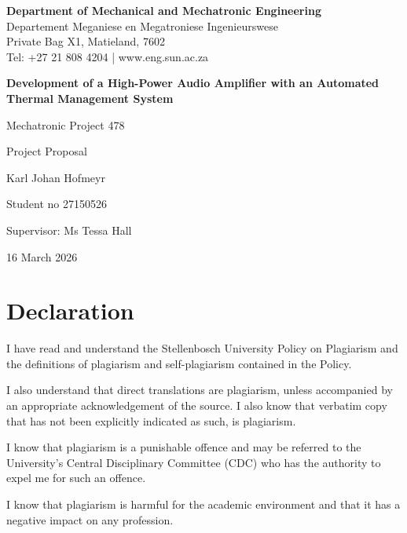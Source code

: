 \documentclass[12pt,a4paper]{report}
\newcommand{\frontmatterpages}{
	\pagenumbering{roman}
}
\newcommand{\departmentheader}{
	\begin{center}
		{\small \textbf{Department of Mechanical and Mechatronic Engineering}}\\
		{\small Departement Meganiese en Megatroniese Ingenieurswese}\\
		{\small Private Bag X1, Matieland, 7602}\\
		{\small Tel: +27 21 808 4204 \;|\; www.eng.sun.ac.za}
	\end{center}
}
\newcommand{\projecttitle}{Development of a High-Power Audio Amplifier with an Automated Thermal Management System}
\newcommand{\projectmodule}{Mechatronic Project 478}
\newcommand{\studentname}{Karl Johan Hofmeyr}
\newcommand{\studentnumber}{27150526}
\newcommand{\supervisorname}{Ms Tessa Hall}
\newcommand{\submissiondate}{16 March 2026}
\begin{document}
	
	\begin{titlepage}
		\departmentheader
		
		\vspace{2.5cm}
		
		\begin{center}
			{\bfseries\LARGE \projecttitle \par}
			\vspace{1.5cm}
			{\Large \projectmodule \par}
			\vspace{0.5cm}
			{\Large Project Proposal \par}
			\vspace{1.5cm}
			{\large \studentname \par}
			{\large Student no \studentnumber \par}
			\vspace{0.8cm}
			{\large Supervisor: \supervisorname \par}
			\vfill
			{\large \submissiondate \par}
		\end{center}
	\end{titlepage}
	
	\frontmatterpages
	
	\chapter*{Declaration}
	
	I have read and understand the Stellenbosch University Policy on Plagiarism and the definitions of plagiarism and self-plagiarism contained in the Policy.
	
	I also understand that direct translations are plagiarism, unless accompanied by an appropriate acknowledgement of the source. I also know that verbatim copy that has not been explicitly indicated as such, is plagiarism.
	
	I know that plagiarism is a punishable offence and may be referred to the University's Central Disciplinary Committee (CDC) who has the authority to expel me for such an offence.
	
	I know that plagiarism is harmful for the academic environment and that it has a negative impact on any profession.
	
\end{document}
